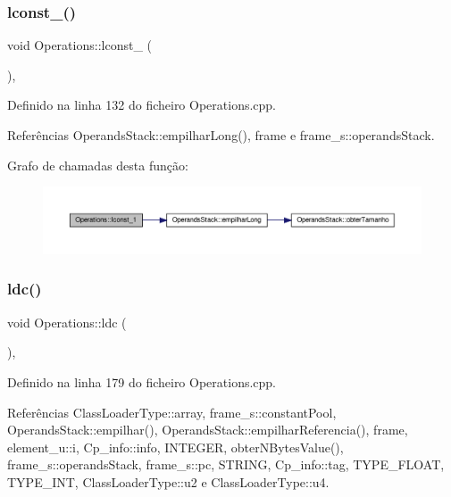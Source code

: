 \subsubsection{\texorpdfstring{lconst\+\_()}{lconst\_1()}}
{\footnotesize\ttfamily void Operations\+::lconst\+\_ (\begin{DoxyParamCaption}{ }\end{DoxyParamCaption})\hspace{0.3cm}{\ttfamily [static]}, {\ttfamily [private]}}



Definido na linha 132 do ficheiro Operations.\+cpp.



Referências Operands\+Stack\+::empilhar\+Long(), frame e frame\+\_\+s\+::operands\+Stack.

Grafo de chamadas desta função\+:\nopagebreak
\begin{figure}[H]
\begin{center}
\leavevmode
\includegraphics[width=350pt]{classOperations_ae6c6a8e3d75dec712e534434f85909ce_cgraph}
\end{center}
\end{figure}
\mbox{\label{classOperations_aa9a87c1ef4605d0b7b7a99c8d9bc693c}} 
\subsubsection{\texorpdfstring{ldc()}{ldc()}}
{\footnotesize\ttfamily void Operations\+::ldc (\begin{DoxyParamCaption}{ }\end{DoxyParamCaption})\hspace{0.3cm}{\ttfamily [static]}, {\ttfamily [private]}}



Definido na linha 179 do ficheiro Operations.\+cpp.



Referências Class\+Loader\+Type\+::array, frame\+\_\+s\+::constant\+Pool, Operands\+Stack\+::empilhar(), Operands\+Stack\+::empilhar\+Referencia(), frame, element\+\_\+u\+::i, Cp\+\_\+info\+::info, I\+N\+T\+E\+G\+ER, obter\+N\+Bytes\+Value(), frame\+\_\+s\+::operands\+Stack, frame\+\_\+s\+::pc, S\+T\+R\+I\+NG, Cp\+\_\+info\+::tag, T\+Y\+P\+E\+\_\+\+F\+L\+O\+AT, T\+Y\+P\+E\+\_\+\+I\+NT, Class\+Loader\+Type\+::u2 e Class\+Loader\+Type\+::u4.

